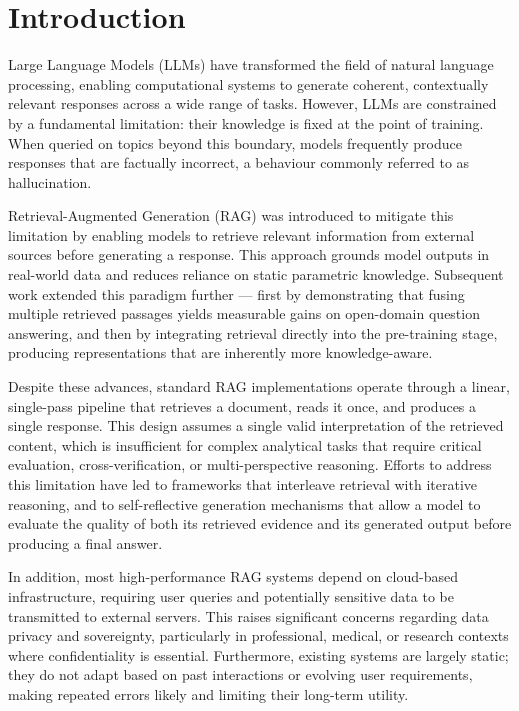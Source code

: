 \chapter{Introduction}

Large Language Models (LLMs) have transformed the field of natural
language processing, enabling computational systems to generate coherent, contextually
relevant responses across a wide range of tasks.
However, LLMs are constrained by a fundamental limitation: their knowledge is fixed
at the point of training.
When queried on topics beyond this boundary, models frequently produce responses that
are factually incorrect, a behaviour commonly referred to as
hallucination.

Retrieval-Augmented Generation (RAG) was introduced to mitigate this limitation by
enabling models to retrieve relevant information from external sources before generating
a response.
This approach grounds model outputs in real-world data and reduces reliance on static
parametric knowledge.
Subsequent work extended this paradigm further — first by demonstrating that fusing
multiple retrieved passages yields measurable gains on open-domain question
answering, and then by integrating retrieval directly into the pre-training stage,
producing representations that are inherently more
knowledge-aware.

Despite these advances, standard RAG implementations operate through a linear,
single-pass pipeline that retrieves a document, reads it once, and produces a single
response.
This design assumes a single valid interpretation of the retrieved content, which is
insufficient for complex analytical tasks that require critical evaluation,
cross-verification, or multi-perspective reasoning.
Efforts to address this limitation have led to frameworks that interleave retrieval
with iterative reasoning, and to self-reflective generation
mechanisms that allow a model to evaluate the quality of both its retrieved evidence
and its generated output before producing a final answer.

In addition, most high-performance RAG systems depend on cloud-based infrastructure,
requiring user queries and potentially sensitive data to be transmitted to external
servers.
This raises significant concerns regarding data privacy and sovereignty, particularly
in professional, medical, or research contexts where confidentiality is
essential.
Furthermore, existing systems are largely static; they do not adapt based on past
interactions or evolving user requirements, making repeated errors likely and limiting
their long-term utility.

